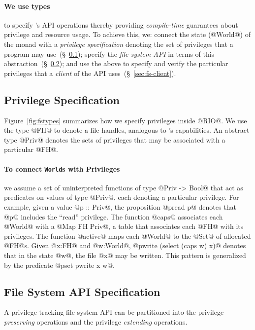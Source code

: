 \paragraph{We use \RIO types} to specify \shill 's API operations
%
thereby providing \emph{compile-time} guarantees 
about privilege and resource usage.
%
To achieve this, we:
%
connect the state (@World@) of the \RIO monad with a
\emph{privilege specification} denoting the set of 
privileges that a program may use~(\S~\ref{sec:privilege-spec});
%
specify the \emph{file system API} in terms of this
abstraction~(\S~\ref{sec:fs-api});
%
and use the above to specify and verify the particular 
privileges that a \emph{client} of the API uses~(\S~\ref{sec:fs-client}).

\subsection{Privilege Specification}
\label{sec:privilege-spec}
%
Figure~\ref{fig:fstypes} summarizes how we specify privileges 
inside @RIO@. 
%
We use the type @FH@ to denote a file handles, analogous to \shill's
capabilities. An abstract type @Priv@ denotes the sets of privileges
that may be associated with a particular @FH@.

\paragraph{To connect \texttt{World}s with Privileges} we assume 
a set of uninterpreted functions of type @Priv ->  Bool@ 
that act as predicates on values of type @Priv@, each 
denoting a particular privilege.
%
For example, given a value @p :: Priv@, the proposition 
@pread p@ denotes that @p@ includes the ``read'' privilege.
%
The function @caps@ associates each @World@ with a @Map FH Priv@,
a table that associates each @FH@ with its privileges.
% 
The function @active@ maps each @World@ to the @Set@ of
allocated @FH@s.
%
Given @x:FH@ and @w:World@, @pwrite (select (caps w) x)@
denotes that in the state @w@, the file @x@ 
may be written.
%
This pattern is generalized by the predicate @pset pwrite x w@.

\subsection{File System API Specification}
\label{sec:fs-api}
%
A privilege tracking file system API can be partitioned into the
privilege \emph{preserving} operations and the privilege \emph{extending}
operations.

